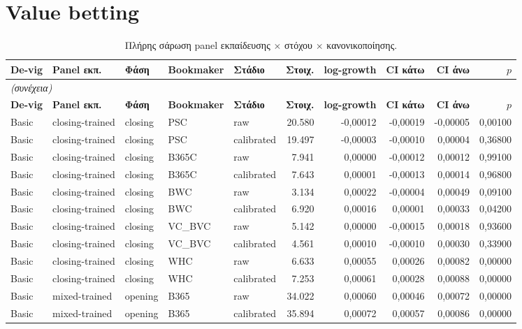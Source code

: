 \section{Value betting}
{\scriptsize
\begin{longtable}{@{}lllllrrrrr@{}}
\caption{Πλήρης σάρωση panel εκπαίδευσης $\times$ στόχου $\times$ κανονικοποίησης.}\label{app:vbsweep}\\
\toprule \textbf{De-vig} & \textbf{Panel εκπ.} & \textbf{Φάση} & \textbf{Bookmaker} & \textbf{Στάδιο} & \textbf{Στοιχ.} & \textbf{log-growth} & \textbf{CI κάτω} & \textbf{CI άνω} & \textbf{$p$} \\\midrule\endfirsthead
\multicolumn{10}{l}{\emph{(συνέχεια)}}\\\toprule \textbf{De-vig} & \textbf{Panel εκπ.} & \textbf{Φάση} & \textbf{Bookmaker} & \textbf{Στάδιο} & \textbf{Στοιχ.} & \textbf{log-growth} & \textbf{CI κάτω} & \textbf{CI άνω} & \textbf{$p$} \\\midrule\endhead
\bottomrule\endfoot
Basic & closing-trained & closing & PSC & raw & 20.580 & -0,00012 & -0,00019 & -0,00005 & 0,00100 \\
Basic & closing-trained & closing & PSC & calibrated & 19.497 & -0,00003 & -0,00010 & 0,00004 & 0,36800 \\
Basic & closing-trained & closing & B365C & raw & 7.941 & 0,00000 & -0,00012 & 0,00012 & 0,99100 \\
Basic & closing-trained & closing & B365C & calibrated & 7.643 & 0,00001 & -0,00013 & 0,00014 & 0,96800 \\
Basic & closing-trained & closing & BWC & raw & 3.134 & 0,00022 & -0,00004 & 0,00049 & 0,09100 \\
Basic & closing-trained & closing & BWC & calibrated & 6.920 & 0,00016 & 0,00001 & 0,00033 & 0,04200 \\
Basic & closing-trained & closing & VC\_BVC & raw & 5.142 & 0,00000 & -0,00015 & 0,00018 & 0,93600 \\
Basic & closing-trained & closing & VC\_BVC & calibrated & 4.561 & 0,00010 & -0,00010 & 0,00030 & 0,33900 \\
Basic & closing-trained & closing & WHC & raw & 6.633 & 0,00055 & 0,00026 & 0,00082 & 0,00000 \\
Basic & closing-trained & closing & WHC & calibrated & 7.253 & 0,00061 & 0,00028 & 0,00088 & 0,00000 \\
Basic & mixed-trained & opening & B365 & raw & 34.022 & 0,00060 & 0,00046 & 0,00072 & 0,00000 \\
Basic & mixed-trained & opening & B365 & calibrated & 35.894 & 0,00072 & 0,00057 & 0,00086 & 0,00000 \\

\end{longtable}}
